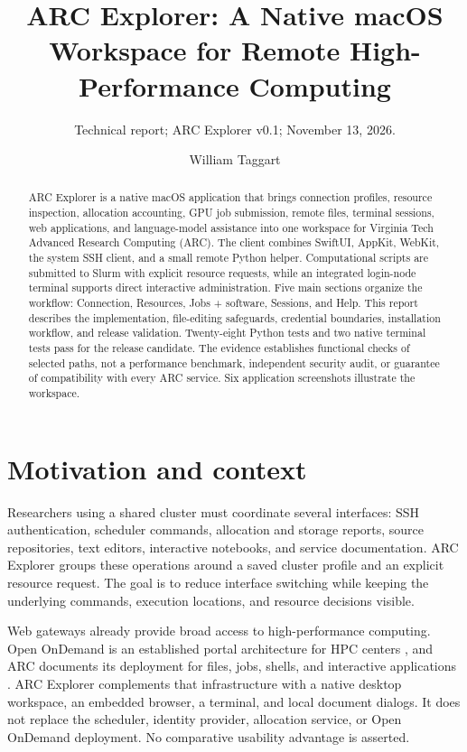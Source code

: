 \documentclass[manuscript,screen,nonacm]{acmart}
\title{ARC Explorer: A Native macOS Workspace for Remote High-Performance Computing}
\subtitle{Technical report; ARC Explorer v0.1; November 13, 2026.}
\author{William Taggart}
\affiliation{\department{Modern and Classical Languages and Literatures}\institution{Virginia Tech}\city{Blacksburg}\state{Virginia}\country{USA}}
\begin{document}
\begin{abstract}
ARC Explorer is a native macOS application that brings connection profiles, resource inspection, allocation accounting, GPU job submission, remote files, terminal sessions, web applications, and language-model assistance into one workspace for Virginia Tech Advanced Research Computing (ARC). The client combines SwiftUI, AppKit, WebKit, the system SSH client, and a small remote Python helper. Computational scripts are submitted to Slurm with explicit resource requests, while an integrated login-node terminal supports direct interactive administration. Five main sections organize the workflow: Connection, Resources, Jobs + software, Sessions, and Help. This report describes the implementation, file-editing safeguards, credential boundaries, installation workflow, and release validation. Twenty-eight Python tests and two native terminal tests pass for the release candidate. The evidence establishes functional checks of selected paths, not a performance benchmark, independent security audit, or guarantee of compatibility with every ARC service. Six application screenshots illustrate the workspace.
\end{abstract}
\maketitle

\section{Motivation and context}

Researchers using a shared cluster must coordinate several interfaces: SSH authentication, scheduler commands, allocation and storage reports, source repositories, text editors, interactive notebooks, and service documentation. ARC Explorer groups these operations around a saved cluster profile and an explicit resource request. The goal is to reduce interface switching while keeping the underlying commands, execution locations, and resource decisions visible.

Web gateways already provide broad access to high-performance computing. Open OnDemand is an established portal architecture for HPC centers \cite{hudak2018}, and ARC documents its deployment for files, jobs, shells, and interactive applications \cite{arcood}. ARC Explorer complements that infrastructure with a native desktop workspace, an embedded browser, a terminal, and local document dialogs. It does not replace the scheduler, identity provider, allocation service, or Open OnDemand deployment. No comparative usability advantage is asserted.
\end{document}
